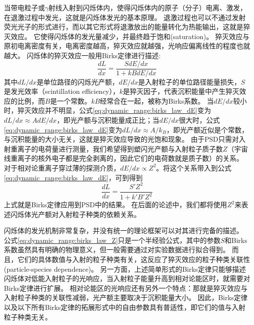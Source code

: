 当带电粒子或$\gamma$射线入射到闪烁体内，使得闪烁体内的原子（分子）电离、激发，在退激过程中发光，这就是闪烁体发光的基本原理。
退激过程也可以不通过发射荧光光子的形式进行，而以其它形式将退激放出的能量转化为热能输出，这就是猝灭效应。
它使得闪烁体的发光量减少，并最终趋于饱和(saturation)。
猝灭效应与原初电离密度有关，电离密度越高，猝灭效应就越强，光响应偏离线性的程度也就越大。
闪烁体的猝灭效应一般用Birks定律进行描述\parencite{birks_article_1951}:
\begin{equation}
	\frac{dL}{dx} = \frac{SdE/dx}{1+kBdE/dx}
	\label{eq:dynamic_range:birks_law_dE}
\end{equation}
其中$dL/dx$是单位路径的闪烁光产额，$dE/dx$是入射粒子的单位路径能量损失，$S$是发光效率（scintillation efficiency），$k$是猝灭因子，代表沉积能量中产生猝灭效应的比例，而$B$是一个常数。$kB$经常合在一起，被称为Birks系数。
当$dE/dx$较小时，猝灭效应并不明显，公式\ref{eq:dynamic_range:birks_law_dE}变为$dL/dx \approx AdE/dx$，即光产额与沉积能量成正比；当$dE/dx$很大时，公式\ref{eq:dynamic_range:birks_law_dE}变为$dL/dx \approx A/k_B$，即光产额近似是个常数，与沉积能量的大小无关，这就是猝灭效应导致的光饱和现象。
由于PSD只需对入射重离子的电荷量进行测量，我们希望得到塑闪光产额与入射粒子质子数$Z$（宇宙线重离子的核外电子都是完全剥离的，因此它们的电荷数就是质子数）的关系。
对于相对论重离子穿过薄的探测介质，$dE/dx \propto Z^2$。将这个关系带入到公式\ref{eq:dynamic_range:birks_law_dE}，可到得到
\begin{equation}
	\frac{dL}{dx} = \frac{S' Z^2}{1+{k'}{B'} Z^2}
	\label{eq:dynamic_range:birks_law_Z}
\end{equation}
上式就是Birks定律应用到PSD中的结果。
在后面的论述中，我们都将使用$Z^2$来表述闪烁体光产额对入射粒子种类的依赖关系。

闪烁体的发光机制非常复杂，并没有统一的理论框架可以对其进行完备的描述。
公式\ref{eq:dynamic_range:birks_law_Z}只是一个半经验公式，其中的参数$S$和Birks系数虽然具有明确的物理意义，但一般需要通过对实验数据进行拟合得到。
而且，它们的具体数值与入射的粒子种类有关，这反应了猝灭效应的粒子种类关联性(particle-species dependence)。
另一方面，上述简单形式的Birks定律只能够描述闪烁体对低能入射粒子的光响应，当入射粒子能量升高到相对论能区时，就需要对Birks定律进行扩展。
相对论能区的光响应还有另外一个特点：那就是猝灭效应与入射粒子种类的关联性减弱，光产额主要取决于沉积能量大小\parencite{matsufuji_response_1999}。
因此，Birks定律以及以下所有Birks定律的拓展形式中的自由参数具有普适性，即它们的值与入射粒子种类无关。

